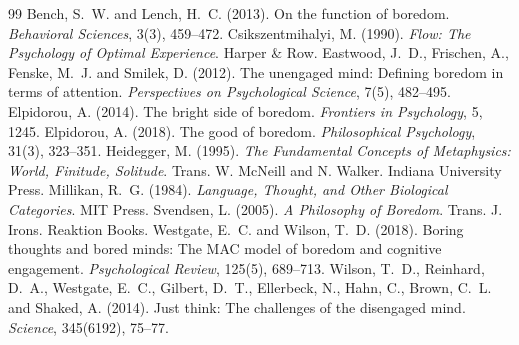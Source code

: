 \documentclass{situationist-preprint}
\begin{document}
\begin{thebibliography}{99}\small
{} Bench, S.~W. and Lench, H.~C. (2013). On the function of boredom. \emph{Behavioral Sciences}, 3(3), 459--472.
 Csikszentmihalyi, M. (1990). \emph{Flow: The Psychology of Optimal Experience}. Harper \& Row.
 Eastwood, J.~D., Frischen, A., Fenske, M.~J. and Smilek, D. (2012). The unengaged mind: Defining boredom in terms of attention. \emph{Perspectives on Psychological Science}, 7(5), 482--495.
 Elpidorou, A. (2014). The bright side of boredom. \emph{Frontiers in Psychology}, 5, 1245.
 Elpidorou, A. (2018). The good of boredom. \emph{Philosophical Psychology}, 31(3), 323--351.
 Heidegger, M. (1995). \emph{The Fundamental Concepts of Metaphysics: World, Finitude, Solitude}. Trans. W. McNeill and N. Walker. Indiana University Press.
 Millikan, R.~G. (1984). \emph{Language, Thought, and Other Biological Categories}. MIT Press.
 Svendsen, L. (2005). \emph{A Philosophy of Boredom}. Trans. J. Irons. Reaktion Books.
 Westgate, E.~C. and Wilson, T.~D. (2018). Boring thoughts and bored minds: The MAC model of boredom and cognitive engagement. \emph{Psychological Review}, 125(5), 689--713.
 Wilson, T.~D., Reinhard, D.~A., Westgate, E.~C., Gilbert, D.~T., Ellerbeck, N., Hahn, C., Brown, C.~L. and Shaked, A. (2014). Just think: The challenges of the disengaged mind. \emph{Science}, 345(6192), 75--77.
\end{thebibliography}
\end{document}
